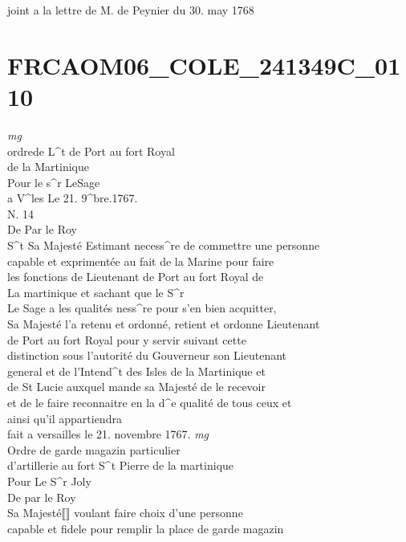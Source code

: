 \documentclass{article}
\begin{document}
\begin{pages}
joint a la lettre de M. de Peynier du 30. may 1768
\pend
\endnumbering\beginnumbering\section{FRCAOM06\_COLE\_241349C\_0110}
\vspace{0.5cm}\noindent
\textit{mg}
\footnotesize \\
ordrede L\^{}t de Port au fort Royal\\
de la Martinique\\
Pour le s\^{}r LeSage
\normalsize \pstart
\\
a V\^{}les Le 21. 9\^{}bre.1767.\\
N. 14\\
De Par le Roy
\pend\pstart
\\
S\^{}t Sa Majesté Estimant necess\^{}re de commettre une personne\\
capable et exprimentée au fait de la Marine pour faire\\
les fonctions de Lieutenant de Port au fort Royal de\\
La martinique et sachant que le S\^{}r\\
Le Sage a les qualités ness\^{}re pour s'en bien acquitter,\\
Sa Majesté l'a retenu et ordonné, retient et ordonne Lieutenant\\
de Port au fort Royal pour y servir suivant cette\\
distinction sous l'autorité du Gouverneur son Lieutenant\\
general et de l'Intend\^{}t des Isles de la Martinique et\\
de St Lucie auxquel mande sa Majesté de le recevoir\\
et de le faire reconnaitre en la d\^{}e qualité de tous ceux et\\
ainsi qu'il appartiendra\\
fait a versailles le 21. novembre 1767.
\pend
\vspace{0.5cm}\noindent
\textit{mg}
\footnotesize \\
Ordre de garde magazin particulier\\
d'artillerie au fort S\^{}t Pierre de la martinique\\
Pour Le S\^{}r Joly
\normalsize \pstart
\\
De par le Roy\\
Sa Majesté⟦⟧ voulant faire choix d'une personne\\
capable et fidele pour remplir la place de garde magazin\\

\end{pages}
\end{document}
